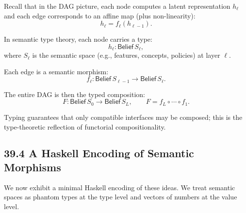 \documentclass[12pt,letterpaper]{article}
\theoremstyle{remark}
\begin{document}
Recall that in the DAG picture, each node computes a latent representation $h_\ell$ and each edge corresponds to an affine map (plus non-linearity):
\[
h_{\ell} = f_\ell(h_{\ell-1}).
\]

In semantic type theory, each node carries a type:
\[
h_\ell : \mathsf{Belief}\,S_\ell,
\]
where $S_\ell$ is the semantic space (e.g., features, concepts, policies) at layer $\ell$.

Each edge is a semantic morphism:
\[
f_\ell : \mathsf{Belief}\,S_{\ell-1} \to \mathsf{Belief}\,S_{\ell}.
\]

The entire DAG is then the typed composition:
\[
F : \mathsf{Belief}\,S_0 \to \mathsf{Belief}\,S_L, \qquad
F = f_L \circ \cdots \circ f_1.
\]

Typing guarantees that only compatible interfaces may be composed; this is the type-theoretic reflection of functorial compositionality.

\subsection{39.4 A Haskell Encoding of Semantic Morphisms}

We now exhibit a minimal Haskell encoding of these ideas. We treat semantic spaces as phantom types at the type level and vectors of numbers at the value level.
\end{document}
